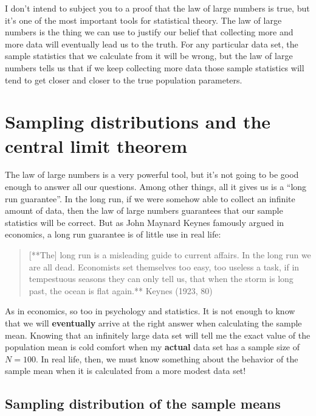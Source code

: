 \documentclass[
  letterpaper,
  DIV=11,
  numbers=noendperiod]{scrreprt}
\begin{document}
I don't intend to subject you to a proof that the law of large numbers
is true, but it's one of the most important tools for statistical
theory. The law of large numbers is the thing we can use to justify our
belief that collecting more and more data will eventually lead us to the
truth. For any particular data set, the sample statistics that we
calculate from it will be wrong, but the law of large numbers tells us
that if we keep collecting more data those sample statistics will tend
to get closer and closer to the true population parameters.

\section{Sampling distributions and the central limit
theorem}\label{sampling-distributions-and-the-central-limit-theorem}

The law of large numbers is a very powerful tool, but it's not going to
be good enough to answer all our questions. Among other things, all it
gives us is a ``long run guarantee''. In the long run, if we were
somehow able to collect an infinite amount of data, then the law of
large numbers guarantees that our sample statistics will be correct. But
as John Maynard Keynes famously argued in economics, a long run
guarantee is of little use in real life:

\begin{quote}
{[}**The{]} long run is a misleading guide to current affairs. In the
long run we are all dead. Economists set themselves too easy, too
useless a task, if in tempestuous seasons they can only tell us, that
when the storm is long past, the ocean is flat again.** Keynes (1923,
80)
\end{quote}

As in economics, so too in psychology and statistics. It is not enough
to know that we will \textbf{eventually} arrive at the right answer when
calculating the sample mean. Knowing that an infinitely large data set
will tell me the exact value of the population mean is cold comfort when
my \textbf{actual} data set has a sample size of \(N=100\). In real
life, then, we must know something about the behavior of the sample mean
when it is calculated from a more modest data set!

\subsection{Sampling distribution of the sample
means}\label{sampling-distribution-of-the-sample-means}
\end{document}
